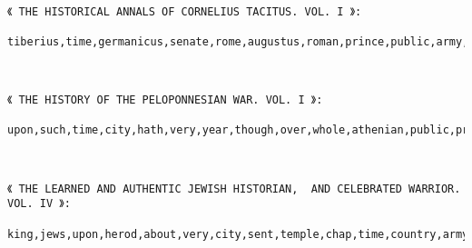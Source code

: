 \documentclass[11pt]{article}
\begin{document}
    \begin{center}
    \end{center}
    { \hspace*{\fill} \\}
    
    \begin{Verbatim}[commandchars=\\\{\}]
《 THE HISTORICAL ANNALS OF CORNELIUS TACITUS. VOL. I 》:
 tiberius,time,germanicus,senate,rome,augustus,roman,prince,public,army,tacitus,piso,emperor,drusus,general,country,nothing,before,name,father

    \end{Verbatim}

    \begin{center}
    \end{center}
    { \hspace*{\fill} \\}
    
    \begin{Verbatim}[commandchars=\\\{\}]
《 THE HISTORY OF THE PELOPONNESIAN WAR. VOL. I 》:
 upon,such,time,city,hath,very,year,though,over,whole,athenian,public,present,greece,peloponnesian,power,place,part,thucydides,state

    \end{Verbatim}

    \begin{center}
    \end{center}
    { \hspace*{\fill} \\}
    
    \begin{Verbatim}[commandchars=\\\{\}]
《 THE LEARNED AND AUTHENTIC JEWISH HISTORIAN,  AND CELEBRATED WARRIOR. VOL. IV 》:
 king,jews,upon,herod,about,very,city,sent,temple,chap,time,country,army,come,jerusalem,while,book,away,hyrcanus,account

    \end{Verbatim}

    \begin{center}
    \end{center}
    { \hspace*{\fill} \\}
    
\end{document}
